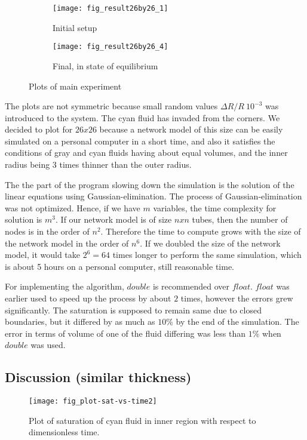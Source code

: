 	\begin{figure}[H]
		\centering
		\begin{subfigure}{0.46\textwidth}
			\centering
			\texttt{[image: fig\_result26by26\_1]}
			\caption{Initial setup}
		\end{subfigure}
		\begin{subfigure}{0.46\textwidth}
			\centering
			\texttt{[image: fig\_result26by26\_4]}
			\caption{Final, in state of equilibrium}
		\end{subfigure}
		\caption{Plots of main experiment}
	\end{figure}
	
	The plots are not symmetric because small random values $\Delta R / R ~ 10^{-3}$ was introduced to the system. The cyan fluid has invaded from the corners. We decided to plot for $26 x 26$ because a network model of this size can be easily simulated on a personal computer in a short time, and also it satisfies the conditions of gray and cyan fluids having about equal volumes, and the inner radius being 3 times thinner than the outer radius.
	
	The the part of the program slowing down the simulation is the solution of the linear equations using Gaussian-elimination. The process of Gaussian-elimination was not optimized. Hence, if we have $m$ variables, the time complexity for solution is $m^3$. If our network model is of size $n x n$ tubes, then the number of nodes is in the order of $n^2$. Therefore the time to compute grows with the size of the network model in the order of $n^6$. If we doubled the size of the network model, it would take $2^6 = 64$ times longer to perform the same simulation, which is about 5 hours on a personal computer, still reasonable time.
	
	For implementing the algorithm, $double$ is recommended over $float$. $float$ was earlier used to speed up the process by about $2$ times, however the errors grew significantly. The saturation is supposed to remain same due to closed boundaries, but it differed by as much as $10\%$ by the end of the simulation. The error in terms of volume of one of the fluid differing was less than $1\%$ when $double$ was used.
	
\subsection{Discussion (similar thickness)} \label{sec:exp-discussion}
	\begin{figure}[H]
		\centering
		\texttt{[image: fig\_plot-sat-vs-time2]}
		\caption{Plot of saturation of cyan fluid in inner region with respect to dimensionless time.}
	\end{figure}
	
